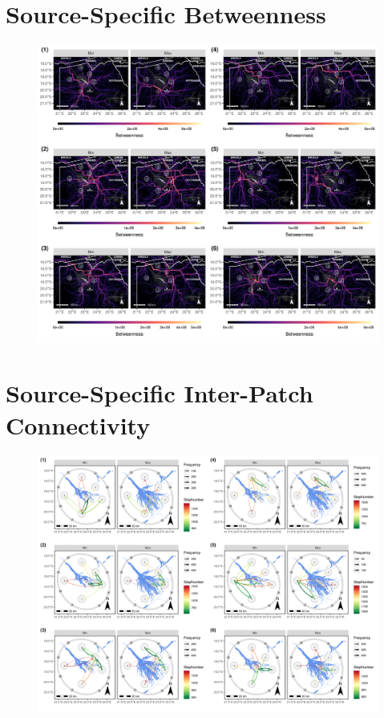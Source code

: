 \documentclass[abstract=on,10pt,a4paper,bibliography=totocnumbered]{article}
\begin{document}
\section{Source-Specific Betweenness}
\begin{figure}[htbp]
  \begin{center}
  \includegraphics[width = \textwidth]{99_BetweennessIndividual.png}
  \caption{}
  \label{Betweenness}
  \end{center}
\end{figure}

\newpage
\section{Source-Specific Inter-Patch Connectivity}
\begin{figure}[htbp]
  \begin{center}
  \includegraphics[width = \textwidth]{99_IPCMain.png}
  \caption{}
  \label{IPCMain}
  \end{center}
\end{figure}
\end{document}
